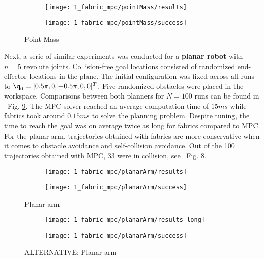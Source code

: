 \begin{figure}[ht]
  \centering
  \begin{subfigure}{0.7\linewidth}
    \centering
    \texttt{[image: 1\_fabric\_mpc/pointMass/results]}
    \caption{}
    \label{subfig:experiment1_pointMass_res}
  \end{subfigure}%
  \begin{subfigure}{0.3\linewidth}
    \centering
    \texttt{[image: 1\_fabric\_mpc/pointMass/success]}
    \caption{}
    \label{subfig:experiment1_pointMass_success}
  \end{subfigure}
  \caption{Point Mass}%
  \label{fig:experiment1_pointMass}
\end{figure}

Next, a serie of similar experiments was conducted for a \textbf{planar robot} with $n=5$
revolute joints. Collision-free goal locations consisted of randomized end-effector
locations in the plane. The initial configuration was fixed across all runs to $\q_0 =
[0.5\pi, 0, -0.5\pi, 0, 0]^T$. Five randomized obstacles were placed in the workspace.
Comparisons between both planners for $N=100$ runs can be found in ~{Fig.
\ref{fig:experiment1_planarArm}}. The MPC solver reached an average computation time of
$15ms$ while fabrics took around $0.15ms$ to solve the planning problem. Despite tuning,
the time to reach the goal was on average twice as long for fabrics compared to MPC. 
For the planar arm, trajectories obtained with fabrics are more conservative when it comes
to obstacle avoidance and self-collision avoidance. Out of the 100 trajectories obtained
with MPC, 33 were in collision, see ~{Fig. \ref{subfig:experiment1_planarArm_success}}.

\begin{figure}[ht]
  \centering
  \begin{subfigure}{0.7\linewidth}
    \centering
    \texttt{[image: 1\_fabric\_mpc/planarArm/results]}
    \caption{}
    \label{subfig:experiment1_planarArm_res}
  \end{subfigure}%
  \begin{subfigure}{0.3\linewidth}
    \centering
    \texttt{[image: 1\_fabric\_mpc/planarArm/success]}
    \caption{}
    \label{subfig:experiment1_planarArm_success}
  \end{subfigure}
  \caption{Planar arm}%
  \label{fig:experiment1_planarArm}
\end{figure}

\begin{figure}[ht]
  \centering
  \begin{subfigure}{0.7\linewidth}
    \centering
    \texttt{[image: 1\_fabric\_mpc/planarArm/results\_long]}
    \caption{}
    \label{subfig:experiment1_planarArm_res}
  \end{subfigure}%
  \begin{subfigure}{0.3\linewidth}
    \centering
    \texttt{[image: 1\_fabric\_mpc/planarArm/success]}
    \caption{}
    \label{subfig:experiment1_planarArm_success}
  \end{subfigure}
  \caption{ALTERNATIVE: Planar arm}%
  \label{fig:experiment1_planarArm}
\end{figure}



